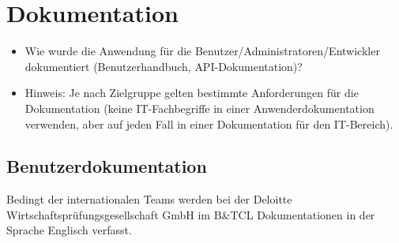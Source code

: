 \section{Dokumentation}
\label{sec:Dokumentation}

\begin{itemize} [label=--]
	\item Wie wurde die Anwendung für die Benutzer/Administratoren/Entwickler dokumentiert (\zB Benutzerhandbuch, \acs{API}-Dokumentation)?
	\item Hinweis: Je nach Zielgruppe gelten bestimmte Anforderungen für die Dokumentation (\zB keine IT-Fachbegriffe in einer Anwenderdokumentation verwenden, aber auf jeden Fall in einer Dokumentation für den IT-Bereich).
\end{itemize}

\subsection{Benutzerdokumentation}
\label{sec:Benutzerdokumentation}
Bedingt der internationalen Teams werden bei der Deloitte Wirtschaftsprüfungsgesellschaft GmbH im \acs{B}\&\acs{TCL} Dokumentationen in der 
Sprache Englisch verfasst.

